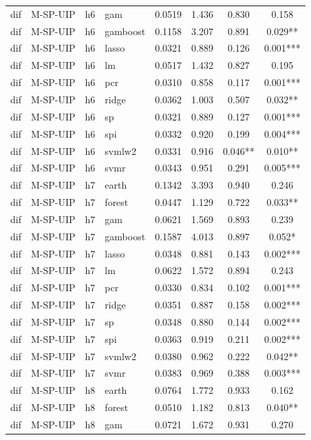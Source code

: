 \begin{ThreePartTable}
\begin{longtable}[t]{llclcccc}
dif & M-SP-UIP & h6 & gam & 0.0519 & 1.436 & 0.830 & 0.158\\
dif & M-SP-UIP & h6 & gamboost & 0.1158 & 3.207 & 0.891 & 0.029**\\
dif & M-SP-UIP & h6 & lasso & 0.0321 & 0.889 & 0.126 & 0.001***\\
dif & M-SP-UIP & h6 & lm & 0.0517 & 1.432 & 0.827 & 0.195\\
dif & M-SP-UIP & h6 & pcr & 0.0310 & 0.858 & 0.117 & 0.001***\\
dif & M-SP-UIP & h6 & ridge & 0.0362 & 1.003 & 0.507 & 0.032**\\
dif & M-SP-UIP & h6 & sp & 0.0321 & 0.889 & 0.127 & 0.001***\\
dif & M-SP-UIP & h6 & spi & 0.0332 & 0.920 & 0.199 & 0.004***\\
dif & M-SP-UIP & h6 & svmlw2 & 0.0331 & 0.916 & 0.046** & 0.010**\\
dif & M-SP-UIP & h6 & svmr & 0.0343 & 0.951 & 0.291 & 0.005***\\
\addlinespace
dif & M-SP-UIP & h7 & earth & 0.1342 & 3.393 & 0.940 & 0.246\\
dif & M-SP-UIP & h7 & forest & 0.0447 & 1.129 & 0.722 & 0.033**\\
dif & M-SP-UIP & h7 & gam & 0.0621 & 1.569 & 0.893 & 0.239\\
dif & M-SP-UIP & h7 & gamboost & 0.1587 & 4.013 & 0.897 & 0.052*\\
dif & M-SP-UIP & h7 & lasso & 0.0348 & 0.881 & 0.143 & 0.002***\\
dif & M-SP-UIP & h7 & lm & 0.0622 & 1.572 & 0.894 & 0.243\\
dif & M-SP-UIP & h7 & pcr & 0.0330 & 0.834 & 0.102 & 0.001***\\
dif & M-SP-UIP & h7 & ridge & 0.0351 & 0.887 & 0.158 & 0.002***\\
dif & M-SP-UIP & h7 & sp & 0.0348 & 0.880 & 0.144 & 0.002***\\
dif & M-SP-UIP & h7 & spi & 0.0363 & 0.919 & 0.211 & 0.002***\\
dif & M-SP-UIP & h7 & svmlw2 & 0.0380 & 0.962 & 0.222 & 0.042**\\
dif & M-SP-UIP & h7 & svmr & 0.0383 & 0.969 & 0.388 & 0.003***\\
\addlinespace
dif & M-SP-UIP & h8 & earth & 0.0764 & 1.772 & 0.933 & 0.162\\
dif & M-SP-UIP & h8 & forest & 0.0510 & 1.182 & 0.813 & 0.040**\\
dif & M-SP-UIP & h8 & gam & 0.0721 & 1.672 & 0.931 & 0.270\\

\end{longtable}
\end{ThreePartTable}
